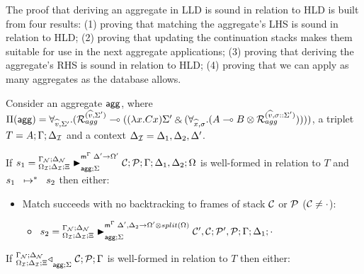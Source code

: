 
The proof that deriving an aggregate in LLD is sound in relation to HLD is built
from four results: (1) proving that matching the aggregate's LHS is sound in
relation to HLD; (2) proving that updating the continuation stacks makes them
suitable for use in the next aggregate applications; (3) proving that deriving
the aggregate's RHS is sound in relation to HLD; (4) proving that we can
apply as many aggregates as the database allows.

\begin{lemma}\label{thm:aggregate_body_match}
Consider an aggregate $\m{agg}$, where $\Pi(\m{agg}) = \forall_{\widehat{v}, \Sigma'}.
   (\defstwo{agg}{\widehat{v}}{\Sigma'} \lolli ((\lambda x. C x)\Sigma' \with (\forall_{\widehat{x}, \sigma}.
                                                (A \lolli B \otimes
                                                 \defstwo{agg}{\widehat{v}}{\sigma
                                                 ::\Sigma'}))))$,
a triplet $T = A; \Gamma; \deltan$ and a context $\deltan = \Delta_1,
  \Delta_2, \Delta'$.

  If $s_1 = \matstatea{\deltan}{\lstack{C};
      \lstack{P}}{\Gamma}{\Delta_1, \Delta_2}{\Omega}{\Delta' \rightarrow
         \Omega'}{\Sigma}$ is well-formed in relation to $T$ and
         $\transs{s_1}{s_2}$ then either:

\begin{itemize}[leftmargin=*]
   \item Match succeeds with no backtracking to frames of stack $\lstack{C}$
   or $\lstack{P}$ ($\lstack{C} \neq \cdot$):

   \begin{itemize}[leftmargin=\secondm]
      \item $s_2 = \matstatea{\deltan}{\lstack{C'}, \lstack{C}; \lstack{P'},
         \lstack{P}}{\Gamma}{\Delta_1}{\cdot}{\Delta', \Delta_2 \rightarrow \Omega' \otimes split(\Omega)}{\Sigma}$
   \end{itemize}

   

\end{itemize}

If $\contstatea{\deltan}{\lstack{C}; \lstack{P}}{\Gamma}{\Sigma}$ is
well-formed in relation to $T$ then either:

\begin{itemize}[leftmargin=*]
   
\end{itemize}
\end{lemma}

